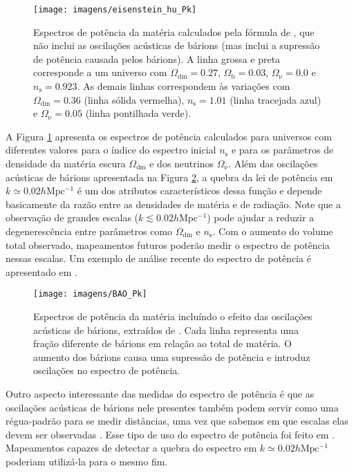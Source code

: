 \documentclass[12pt,a4paper]{article}
\begin{document}
\begin{figure}[t]
\centering
\texttt{[image: imagens/eisenstein\_hu\_Pk]}
\caption{Espectros de potência da matéria calculados pela fórmula de \citet{Eisenstein97x}, 
que não inclui as oscilações acústicas de bárions (mas inclui a supressão de potência causada 
pelos bárions). 
A linha grossa e preta corresponde a um universo com $\Omega_{\mathrm{dm}}=0.27$, $\Omega_{\mathrm{b}}=0.03$, 
$\Omega_{\mathrm{\nu}}=0.0$ e $n_{\mathrm{s}}=0.923$. As demais linhas correspondem às 
variações com $\Omega_{\mathrm{dm}}=0.36$ (linha sólida vermelha), $n_{\mathrm{s}}=1.01$ 
(linha tracejada azul) e $\Omega_{\mathrm{\nu}}=0.05$ (linha pontilhada verde).}
\label{fig:eisenstein-hu-Pk}
\end{figure} 

A Figura \ref{fig:eisenstein-hu-Pk} apresenta os espectros de potência calculados 
para universos com diferentes valores para o índice do espectro inicial $n_{\mathrm{s}}$ 
e para os parâmetros de densidade da matéria escura $\Omega_{\mathrm{dm}}$ e dos neutrinos 
$\Omega_{\mathrm{\nu}}$. Além das oscilações acústicas de bárions apresentada na Figura 
\ref{fig:BAO-Pk}, a quebra da lei de potência em $k\simeq 0.02h\mathrm{Mpc^{-1}}$ é um 
dos atributos característicos dessa função e depende basicamente da razão entre as 
densidades de matéria e de radiação. Note que a observação de grandes escalas 
($k\lesssim 0.02h\mathrm{Mpc^{-1}}$) pode ajudar a reduzir a degenerescência entre 
parâmetros como $\Omega_{\mathrm{dm}}$ e $n_{\mathrm{s}}$. Com o aumento do volume total 
observado, mapeamentos futuros poderão medir o espectro de potência nessas escalas.
Um exemplo de análise recente do espectro de potência é apresentado em \citet{Percival07x}. 

\begin{figure}[t]
\centering
\texttt{[image: imagens/BAO\_Pk]}
\caption{Espectros de potência da matéria incluíndo o efeito das oscilações 
acústicas de bárions, extraídos de \citet{Percival06x}. Cada linha representa 
uma fração diferente de bárions em relação ao total de matéria. O aumento dos 
bárions causa uma supressão de potência e introduz oscilações no espectro de potência.}
\label{fig:BAO-Pk}
\end{figure} 
  
Outro aspecto interessante das medidas do espectro de potência é que as oscilações 
acústicas de bárions nele presentes também podem servir como uma régua-padrão para 
se medir distâncias, uma vez que sabemos em que escalas elas devem ser observadas 
\citep[e.g.,][]{Hu96x}. 
Esse tipo de uso do espectro de potência foi feito em \citet{Anderson12x}. Mapeamentos 
capazes de detectar a quebra do espectro em $k\simeq 0.02h\mathrm{Mpc^{-1}}$ poderiam 
utilizá-la para o mesmo fim.
\end{document}

